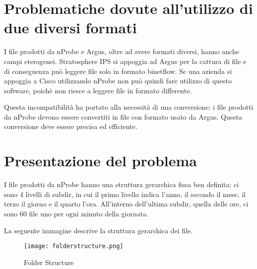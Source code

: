 \documentclass[../main.tex]{subfiles}
\begin{document}
\section{Problematiche dovute all'utilizzo di due diversi formati}
I file prodotti da nProbe e Argus, oltre ad avere formati diversi, hanno anche campi eterogenei. Stratosphere IPS si appoggia ad Argus per la cattura di file e di conseguenza può leggere file solo in formato binetflow. 
Se una azienda si appoggia a Cisco utilizzando nProbe non può quindi fare utilizzo di questo software, poichè non riesce a leggere file in formato differente.

Questa incompatibilità ha portato alla necessità di una conversione: i file prodotti da nProbe devono essere convertiti in file con formato usato da Argus. Questa conversione deve essere precisa ed efficiente.

\section{Presentazione del problema}
I file prodotti da nProbe hanno una struttura gerarchica fissa ben definita: ci sono 4 livelli di subdir, in cui il primo livello indica l'anno, il secondo il mese, il terzo il giorno e il quarto l'ora. All'interno dell'ultima subdir, quella delle ore, ci sono 60 file uno per ogni minuto della giornata.

La seguente immagine descrive la struttura gerarchica dei file.

\begin{figure}[H]
\centering
\texttt{[image: folderstructure.png]}
\caption{Folder Structure}
\end{figure}
\end{document}
